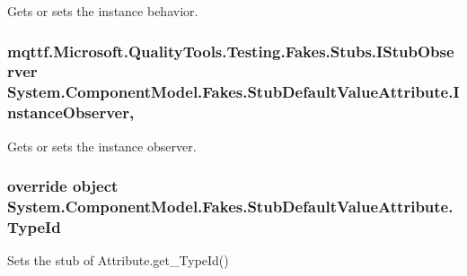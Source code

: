 Gets or sets the instance behavior.

\hypertarget{class_system_1_1_component_model_1_1_fakes_1_1_stub_default_value_attribute_aecd318eb3267f24e533ae5596f05e0dd}{
\subsubsection[{Instance\-Observer}]{\setlength{\rightskip}{0pt plus 5cm}mqttf.\-Microsoft.\-Quality\-Tools.\-Testing.\-Fakes.\-Stubs.\-I\-Stub\-Observer System.\-Component\-Model.\-Fakes.\-Stub\-Default\-Value\-Attribute.\-Instance\-Observer\hspace{0.3cm}{\ttfamily [get]}, {\ttfamily [set]}}}\label{class_system_1_1_component_model_1_1_fakes_1_1_stub_default_value_attribute_aecd318eb3267f24e533ae5596f05e0dd}


Gets or sets the instance observer.

\hypertarget{class_system_1_1_component_model_1_1_fakes_1_1_stub_default_value_attribute_a31f73d3ed4fa1cd638fe68c8cd45f045}{
\subsubsection[{Type\-Id}]{\setlength{\rightskip}{0pt plus 5cm}override object System.\-Component\-Model.\-Fakes.\-Stub\-Default\-Value\-Attribute.\-Type\-Id\hspace{0.3cm}{\ttfamily [get]}}}\label{class_system_1_1_component_model_1_1_fakes_1_1_stub_default_value_attribute_a31f73d3ed4fa1cd638fe68c8cd45f045}


Sets the stub of Attribute.\-get\-\_\-\-Type\-Id()

